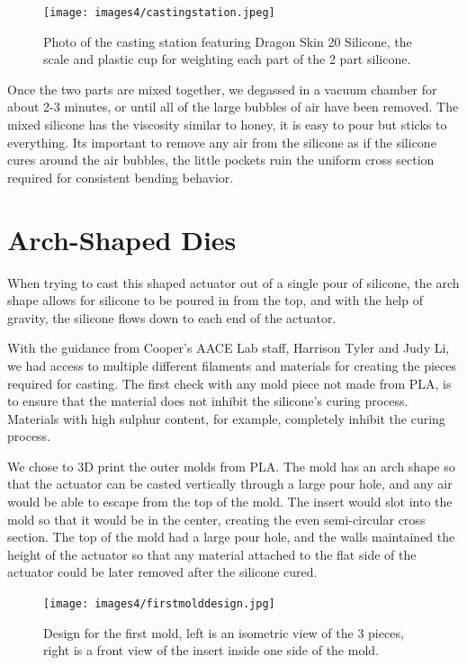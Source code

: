 \begin{figure}[h]
    \centering
    \texttt{[image: images4/castingstation.jpeg]}
    \caption{Photo of the casting station featuring Dragon Skin 20 Silicone, the scale and plastic cup for weighting each part of the 2 part silicone.}
    \label{fig:castingstation}
\end{figure}

Once the two parts are mixed together, we degassed in a vacuum chamber for about 2-3 minutes, or until all of the large bubbles of air have been removed. The mixed silicone has the viscosity similar to honey, it is easy to pour but sticks to everything. Its important to remove any air from the silicone as if the silicone cures around the air bubbles, the little pockets ruin the uniform cross section required for consistent bending behavior. 

\section{Arch-Shaped Dies}
When trying to cast this shaped actuator out of a single pour of silicone, the arch shape allows for silicone to be poured in from the top, and with the help of gravity, the silicone flows down to each end of the actuator. 

With the guidance from Cooper's AACE Lab staff, Harrison Tyler and Judy Li, we had access to multiple different filaments and materials for creating the pieces required for casting. The first check with any mold piece not made from PLA, is to ensure that the material does not inhibit the silicone's curing process. Materials with high sulphur content, for example, completely inhibit the curing process. 

We chose to 3D print the outer molds from PLA. The mold has an arch shape so that the actuator can be casted vertically through a large pour hole, and any air would be able to escape from the top of the mold. The insert would slot into the mold so that it would be in the center, creating the even semi-circular cross section. The top of the mold had a large pour hole, and the walls maintained the height of the actuator so that any material attached to the flat side of the actuator could be later removed after the silicone cured. 

\begin{figure}[h]
    \centering
    \texttt{[image: images4/firstmolddesign.jpg]}
    \caption{Design for the first mold, left is an isometric view of the 3 pieces, right is a front view of the insert inside one side of the mold.}
    \label{fig:firstmold}
\end{figure}

